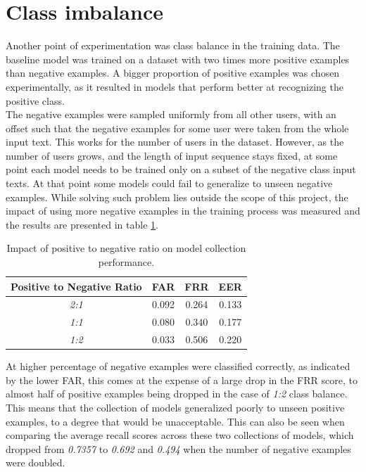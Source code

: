 \section{Class imbalance}
Another point of experimentation was class balance in the training data. The baseline model was trained on a dataset with two times more positive examples than negative examples. A bigger proportion of positive examples was chosen experimentally, as it resulted in models that perform better at recognizing the positive class. \\ 
The negative examples were sampled uniformly from all other users, with an offset such that the negative examples for some user were taken from the whole input text. This works for the number of users in the dataset. However, as the number of users grows, and the length of input sequence stays fixed, at some point each model needs to be trained only on a subset of the negative class input texts. At that point some models could fail to generalize to unseen negative examples. 
While solving such problem lies outside the scope of this project, the impact of using more negative examples in the training process was measured and the results are presented in table \ref{table:egde_encoding_comp}.


\begin{center}
	\begin{table}[H]
		\begin{center}
			\begin{tabular}{ |c|c|c|c| } 
				\hline
				Positive to Negative Ratio & FAR & FRR & EER \\
				\hline
				\textit{2:1} & 0.092 & 0.264 & 0.133 \\
				\hline
				\textit{1:1} & 0.080 & 0.340 & 0.177 \\
				\hline
				\textit{1:2} & 0.033 & 0.506 & 0.220 \\
				\hline
			\end{tabular}
		\end{center}
		\caption{Impact of positive to negative ratio on model collection performance.}
		\label{table:egde_encoding_comp}
	\end{table}
\end{center}

At higher percentage of negative examples were classified correctly, as indicated by the lower FAR, this comes at the expense of a large drop in the FRR score, to almost half of positive examples being dropped in the case of \textit{1:2} class balance. This means that the collection of models generalized poorly to unseen positive examples, to a degree that would be unacceptable. This can also be seen when comparing the average recall scores across these two collections of models, which dropped from \textit{0.7357} to \textit{0.692} and \textit{0.494} when the number of negative examples were doubled. 
